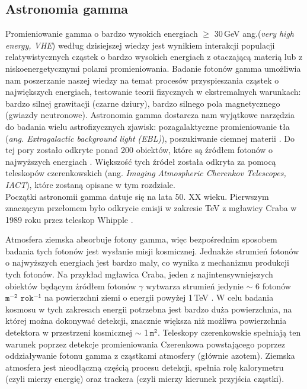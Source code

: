 \documentclass[a4paper,11pt,twoside]{article}
\begin{document}
\subsection{Astronomia gamma}
Promieniowanie gamma o bardzo wysokich energiach $\geq$ 30\,GeV ang.(\textsl{very high energy, VHE}) według dzisiejszej wiedzy jest wynikiem interakcji populacji relatywistycznych cząstek o bardzo wysokich energiach z otaczającą materią lub z niskoenergetycznymi polami promieniowania. Badanie fotonów gamma umożliwia nam poszerzanie naszej wiedzy na temat procesów przyspieszania cząstek o największych energiach, testowanie teorii fizycznych w ekstremalnych warunkach: bardzo silnej grawitacji (czarne dziury), bardzo silnego pola magnetycznego (gwiazdy neutronowe). Astronomia gamma dostarcza nam wyjątkowe narzędzia do badania wielu astrofizycznych zjawisk: pozagalaktyczne promieniowanie tła (\textsl{ang. Extragalactic background light (EBL)}), poszukiwanie ciemnej materii \cite{Gamma-ray_article}. Do tej pory zostało odkryte ponad 200 obiektów, które są źródłem fotonów o najwyższych energiach \cite{TeVCat}. Większość tych źródeł została odkryta za pomocą teleskopów czerenkowskich (ang. \textsl{Imaging Atmospheric Cherenkov Telescopes, IACT}), które zostaną opisane w tym rozdziale.\\
Początki astronomii gamma datuje się na lata 50. XX wieku.
Pierwszym znaczącym przełomem było odkrycie emisji w zakresie TeV z mgławicy Craba w 1989 roku przez teleskop Whipple \cite{whipple}.

Atmosfera ziemska absorbuje fotony gamma, więc bezpośrednim sposobem badania tych fotonów jest wysłanie misji kosmicznej. Jednakże strumień fotonów o najwyższych energiach jest bardzo mały, co wynika z mechanizmu produkcji tych fotonów. Na przykład mgławica Craba, jeden z najintensywniejszych obiektów będącym źródłem fotonów $\gamma$ wytwarza strumień jedynie $\sim$ 6 fotonów $\mathtt{m^{-2}}$ $\mathtt{rok^{-1}}$ na powierzchni ziemi o energii powyżej 1\,TeV \cite{IACT}. W celu badania kosmosu w tych zakresach energii potrzebna jest bardzo duża powierzchnia, na której można dokonywać detekcji, znacznie większa niż możliwa powierzchnia detektora w przestrzeni kosmicznej $\sim$ 1\,$\mathtt{m^{2}}$. Teleskopy czerenkowskie spełniają ten warunek poprzez detekcje promieniowania Czerenkowa powstającego poprzez oddziaływanie fotonu gamma z cząstkami atmosfery (głównie azotem). Ziemska atmosfera jest nieodłączną częścią procesu detekcji, spełnia rolę kalorymetru (czyli mierzy energię) oraz trackera (czyli mierzy kierunek przyjścia cząstki). \\
\end{document}
